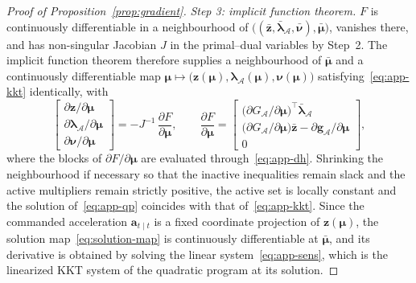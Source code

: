 \documentclass[11pt]{article}
\theoremstyle{plain}
\theoremstyle{definition}
\begin{document}
\begin{proof}[Proof of Proposition~\ref{prop:gradient}]
	\emph{Step 3: implicit function theorem.} $F$ is continuously
	differentiable in a neighbourhood of
	$\big((\bar{\bm{z}},\bar{\bm{\lambda}}_{\mathcal{A}},\bar{\bm{\nu}}),
		\bar{\bm{\mu}}\big)$, vanishes there, and has non-singular
	Jacobian $J$ in the primal--dual variables by Step~2. The implicit
	function theorem therefore supplies a neighbourhood of
	$\bar{\bm{\mu}}$ and a continuously differentiable map
	$\bm{\mu}\mapsto
		\big(\bm{z}(\bm{\mu}),\bm{\lambda}_{\mathcal{A}}(\bm{\mu}),
		\bm{\nu}(\bm{\mu})\big)$ satisfying~\eqref{eq:app-kkt}
	identically, with
	\begin{equation}
		\label{eq:app-sens}
		\begin{bmatrix}
			\partial\bm{z}/\partial\bm{\mu} \\
			\partial\bm{\lambda}_{\mathcal{A}}/\partial\bm{\mu} \\
			\partial\bm{\nu}/\partial\bm{\mu}
		\end{bmatrix}
		=-J^{-1}\,
		\frac{\partial F}{\partial\bm{\mu}} ,
		\qquad
		\frac{\partial F}{\partial\bm{\mu}}
		=
		\begin{bmatrix}
			\big(\partial G_{\mathcal{A}}/\partial\bm{\mu}\big)^{\top}
			\bar{\bm{\lambda}}_{\mathcal{A}}                              \\
			\big(\partial G_{\mathcal{A}}/\partial\bm{\mu}\big)\bar{\bm{z}}
			-\partial\bm{g}_{\mathcal{A}}/\partial\bm{\mu}                 \\
			0
		\end{bmatrix},
	\end{equation}
	where the blocks of $\partial F/\partial\bm{\mu}$ are evaluated
	through~\eqref{eq:app-dh}. Shrinking the neighbourhood if necessary
	so that the inactive inequalities remain slack and the active
	multipliers remain strictly positive, the active set is locally
	constant and the solution of~\eqref{eq:app-qp} coincides with that
	of~\eqref{eq:app-kkt}. Since the commanded acceleration
	$\bm{a}_{t\mid t}$ is a fixed coordinate projection of
	$\bm{z}(\bm{\mu})$, the solution map~\eqref{eq:solution-map} is
	continuously differentiable at $\bar{\bm{\mu}}$, and its derivative
	is obtained by solving the linear system~\eqref{eq:app-sens}, which
	is the linearized KKT system of the quadratic program at its
	solution.
\end{proof}
\end{document}
